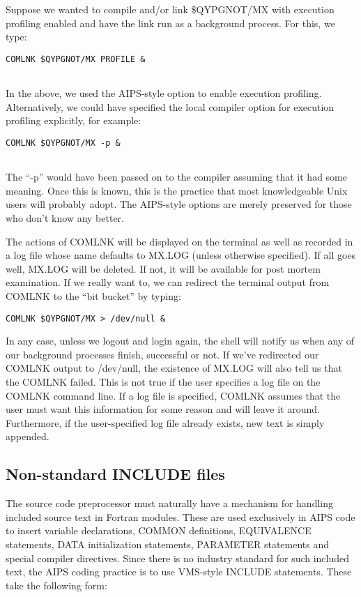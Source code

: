 Suppose we wanted to compile and/or link \$QYPGNOT/MX with execution
profiling enabled and have the link run as a background process.  For
this, we type:

\begin{verbatim}
COMLNK $QYPGNOT/MX PROFILE &


\end{verbatim}
In the above, we used the AIPS-style option to enable execution
profiling. Alternatively, we could have specified the local compiler
option for execution profiling explicitly, for example:


\begin{verbatim}
COMLNK $QYPGNOT/MX -p &


\end{verbatim}
The ``-p'' would have been passed on to the compiler assuming that it
had some meaning.  Once this is known, this is the practice that most
knowledgeable Unix users will probably adopt.  The AIPS-style options
are merely preserved for those who don't know any better.

The actions of COMLNK will be displayed on the terminal as well as
recorded in a log file whose name defaults to MX.LOG (unless otherwise
specified).  If all goes well, MX.LOG will be deleted.  If not, it
will be available for post mortem examination.  If we really want to,
we can redirect the terminal output from COMLNK to the ``bit bucket'' by
typing:

\begin{verbatim}
COMLNK $QYPGNOT/MX > /dev/null &

\end{verbatim}
In any case, unless we logout and login again, the shell will notify
us when any of our background processes finish, successful or not. If
we've redirected our COMLNK output to /dev/null, the existence of
MX.LOG will also tell us that the COMLNK failed.  This is not true if
the user specifies a log file on the COMLNK command line.  If a log
file is specified, COMLNK assumes that the user must want this
information for some reason and will leave it around.  Furthermore, if
the user-specified log file already exists, new text is simply
appended.


\subsection{Non-standard INCLUDE files}
The source code preprocessor must naturally have a mechanism for
handling included source text in Fortran modules.  These are used
exclusively in AIPS code to insert variable declarations, COMMON
definitions, EQUIVALENCE statements, DATA initialization statements,
PARAMETER statements and special compiler directives.  Since there is
no industry standard for such included text, the AIPS coding practice
is to use VMS-style INCLUDE statements.  These take the following
form:

